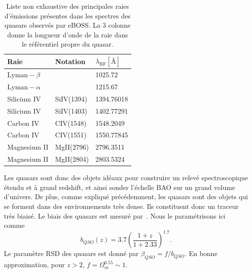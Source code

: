 \documentclass[11pt, twoside, a4paper, openright]{report}
\begin{document}
\begin{table}[]
  \centering
  \caption{Liste non exhaustive des principales raies d'émissions présentes dans les spectres des quasars observés par eBOSS. La 3 colonne donne la longueur d'onde de la raie dans le référentiel propre du quasar.}
  \label{tab:raies}
  \begin{tabular}{lll}
    \toprule
    Raie & Notation & $\lambda_{\mathrm{\mathrm{RF}}} [\si{\angstrom}]$ \\
    \midrule
    $\mathrm{Lyman-}\beta$ & \lyb{}  & \num{1025.72} \\
    $\mathrm{Lyman-}\alpha$ & \lya{} & \num{1215.67} \\
    Silicium IV & SiIV(1394) & \num{1394.76018} \\
    Silicium IV & SiIV(1403) & \num{1402.77291} \\
    Carbon IV & CIV(1548) & \num{1548.2049} \\
    Carbon IV & CIV(1551) & \num{1550.77845} \\
    Magnesium II & MgII(2796) & \num{2796.3511} \\
    Magnesium II & MgII(2804) & \num{2803.5324}\\
    \bottomrule
  \end{tabular}
\end{table}

Les quasars sont donc des objets idéaux pour construire un relevé spectroscopique étendu et à grand redshift, et ainsi sonder l'échelle BAO sur un grand volume d'univers. De plus, comme expliqué précédemment, les quasars sont des objets qui se forment dans des environnements très dense. Ils constituent donc un traceur très biaisé. Le biais des quasars est mesuré par~\cite{Laurent2017}. Nous le paramétrisons ici comme
\begin{equation}
  \label{eq:b_qso}
b_{QSO}(z) = 3.7 \left(\frac{1+z}{1+2.33}\right)^{1.7} .
\end{equation} 
Le paramètre RSD des quasars est donné par $\beta_{QSO} = f / b_{QSO}$. En bonne approximation, pour $z > 2$, $f = \Omega_m^{\num{0.55}} \sim 1$. 
\end{document}
